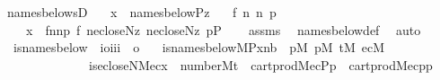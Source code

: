\begin{isabellebody}
\ names{\isacharunderscore}{\kern0pt}belowsD{\isacharcolon}{\kern0pt}\isanewline
\ \ \ {\isachardoublequoteopen}x\ {\isasymin}\ names{\isacharunderscore}{\kern0pt}below{\isacharparenleft}{\kern0pt}P{\isacharcomma}{\kern0pt}z{\isacharparenright}{\kern0pt}{\isachardoublequoteclose}\isanewline
\ \ \ f\ n{}\ n{}\ p\ \isanewline
\ \ \ \ {\isachardoublequoteopen}x\ {\isacharequal}{\kern0pt}\ {\isasymlangle}f{\isacharcomma}{\kern0pt}n{}{\isacharcomma}{\kern0pt}n{}{\isacharcomma}{\kern0pt}p{\isasymrangle}{\isachardoublequoteclose}\ {\isachardoublequoteopen}f{\isasymin}{}{\isachardoublequoteclose}\ {\isachardoublequoteopen}n{}{\isasymin}ecloseN{\isacharparenleft}{\kern0pt}z{\isacharparenright}{\kern0pt}{\isachardoublequoteclose}\ {\isachardoublequoteopen}n{}{\isasymin}ecloseN{\isacharparenleft}{\kern0pt}z{\isacharparenright}{\kern0pt}{\isachardoublequoteclose}\ {\isachardoublequoteopen}p{\isasymin}P{\isachardoublequoteclose}\isanewline
%
\isadelimproof
\ \ %
\endisadelimproof
%
\isatagproof
{}\isamarkupfalse%
\ assms\ \isamarkupfalse%
\ names{\isacharunderscore}{\kern0pt}below{\isacharunderscore}{\kern0pt}def\ \isamarkupfalse%
\ auto%
\endisatagproof
{\isafoldproof}%
%
\isadelimproof
\isanewline
%
\endisadelimproof
\isanewline
\isanewline
{}\isamarkupfalse%
\isanewline
\ \ is{\isacharunderscore}{\kern0pt}names{\isacharunderscore}{\kern0pt}below\ {\isacharcolon}{\kern0pt}{\isacharcolon}{\kern0pt}\ {\isachardoublequoteopen}{\isacharbrackleft}{\kern0pt}i{\isasymRightarrow}o{\isacharcomma}{\kern0pt}i{\isacharcomma}{\kern0pt}i{\isacharcomma}{\kern0pt}i{\isacharbrackright}{\kern0pt}\ {\isasymRightarrow}\ o{\isachardoublequoteclose}\ \isanewline
\ \ {\isachardoublequoteopen}is{\isacharunderscore}{\kern0pt}names{\isacharunderscore}{\kern0pt}below{\isacharparenleft}{\kern0pt}M{\isacharcomma}{\kern0pt}P{\isacharcomma}{\kern0pt}x{\isacharcomma}{\kern0pt}nb{\isacharparenright}{\kern0pt}\ {\isasymequiv}\ {\isasymexists}p{}{\isacharbrackleft}{\kern0pt}M{\isacharbrackright}{\kern0pt}{\isachardot}{\kern0pt}\ {\isasymexists}p{}{\isacharbrackleft}{\kern0pt}M{\isacharbrackright}{\kern0pt}{\isachardot}{\kern0pt}\ {\isasymexists}t{\isacharbrackleft}{\kern0pt}M{\isacharbrackright}{\kern0pt}{\isachardot}{\kern0pt}\ {\isasymexists}ec{\isacharbrackleft}{\kern0pt}M{\isacharbrackright}{\kern0pt}{\isachardot}{\kern0pt}\isanewline
\ \ \ \ \ \ \ \ \ \ \ \ \ \ is{\isacharunderscore}{\kern0pt}ecloseN{\isacharparenleft}{\kern0pt}M{\isacharcomma}{\kern0pt}ec{\isacharcomma}{\kern0pt}x{\isacharparenright}{\kern0pt}\ {\isasymand}\ number{}{\isacharparenleft}{\kern0pt}M{\isacharcomma}{\kern0pt}t{\isacharparenright}{\kern0pt}\ {\isasymand}\ cartprod{\isacharparenleft}{\kern0pt}M{\isacharcomma}{\kern0pt}ec{\isacharcomma}{\kern0pt}P{\isacharcomma}{\kern0pt}p{}{\isacharparenright}{\kern0pt}\ {\isasymand}\ cartprod{\isacharparenleft}{\kern0pt}M{\isacharcomma}{\kern0pt}ec{\isacharcomma}{\kern0pt}p{}{\isacharcomma}{\kern0pt}p{}{\isacharparenright}{\kern0pt}\isanewline

\end{isabellebody}
